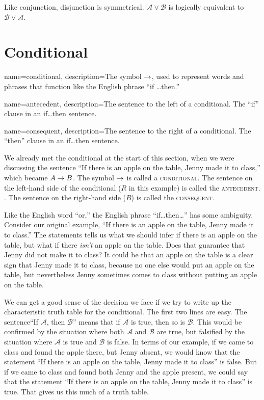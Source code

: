 Like conjunction, disjunction is symmetrical. $\mathcal{A}\lor\mathcal{B}$ is logically equivalent to $\mathcal{B}\lor\mathcal{A}$.

\section{Conditional}

{
name=conditional,
description={The symbol $\mathrel{\rightarrow}$, used to represent words and phrases that function like the English phrase ``if \ldots then.''}
}

{
name=antecedent,
description={The sentence to the left of a conditional. The ``if'' clause in an if\ldots then sentence.}
}

{
name=consequent,
description={The sentence to the right of a conditional. The ``then'' clause in an if\ldots then sentence.}
}

We already met the conditional at the start of this section, when we were discussing the sentence ``If there is an apple on the table, Jenny made it to class,'' which became $A \mathrel{\rightarrow} B$. The symbol $\mathrel{\rightarrow}$ is called a \textsc{\gls{conditional}}. \label{def:conditional} The sentence on the left-hand side of the conditional ($R$ in this example) is called the \textsc{\gls{antecedent}}. \label{def:antecedent}.  The sentence on the right-hand side ($B$) is called the \textsc{\gls{consequent}}. \label{def:consequent}

Like the English word ``or,'' the English phrase ``if\ldots then\ldots'' has some ambiguity. Consider our original example, ``If there is an apple on the table, Jenny made it to class.'' The statements tells us what we should infer if there is an apple on the table, but what if there \emph{isn't} an apple on the table. Does that guarantee that Jenny did not make it to class? It could be that an apple on the table is a clear sign that Jenny made it to class, because no one else would put an apple on the table, but nevertheless Jenny sometimes comes to class without putting an apple on the table.

We can get a good sense of the decision we face if we try to write up the characteristic truth table for the conditional. The first two lines are easy. The sentence``If $\mathcal{A}$, then $\mathcal{B}$'' means that if $\mathcal{A}$ is true, then so is $\mathcal{B}$. This would be confirmed by the situation where both $\mathcal{A}$ and $\mathcal{B}$ are true, but falsified by the situation where $\mathcal{A}$ is true and $\mathcal{B}$ is false. In terms of our example, if we came to class and found the apple there, but Jenny absent, we would know that the statement ``If there is an apple on the table, Jenny made it to class'' is false. But if we came to class and found both Jenny and the apple present, we could say that the statement ``If there is an apple on the table, Jenny made it to class'' is true. That gives us this much of a truth table.


